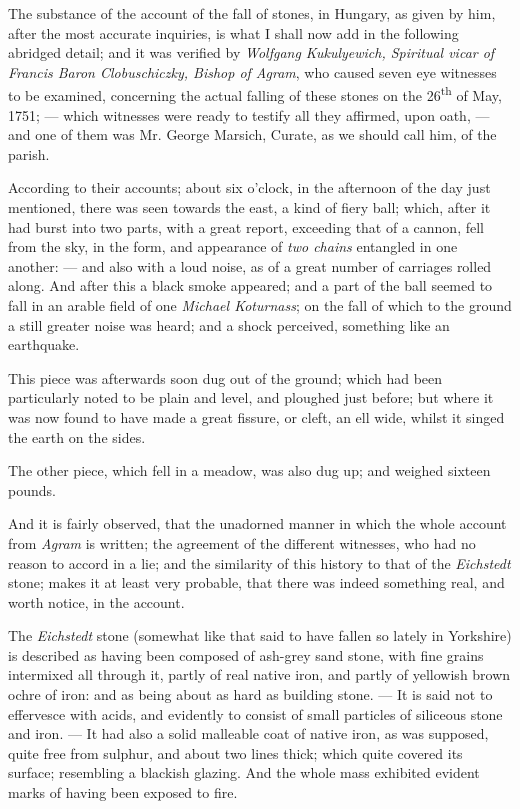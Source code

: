 \documentclass[a4paper, 12pt, oneside, twocolumn]{article}
\begin{document}
The substance of the account of the fall of stones, in Hungary, as given by him, after the most accurate inquiries, is what I shall now add in the following abridged detail; and it was verified by \emph{Wolfgang Kukulyewich, Spiritual vicar of Francis Baron Clobuschiczky, Bishop of Agram}, who caused seven eye witnesses to be examined, concerning the actual falling of these stones on the 26\textsuperscript{th} of May, 1751; --- which witnesses were ready to testify all they affirmed, upon oath, --- and one of them was Mr. George Marsich, Curate, as we should call him, of the parish.

According to their accounts; about six o'clock, in the afternoon of the day just mentioned, there was seen towards the east, a kind of fiery ball; which, after it had burst into two parts, with a great report, exceeding that of a cannon, fell from the sky, in the form, and appearance of \emph{two chains} entangled in one another: --- and also with a loud noise, as of a great number of carriages rolled along. And after this a black smoke appeared; and a part of the ball seemed to fall in an arable field of one \emph{Michael Koturnass}; on the fall of which to the ground a still greater noise was heard; and a shock perceived, something like an earthquake.

This piece was afterwards soon dug out of the ground; which had been particularly noted to be plain and level, and ploughed just before; but where it was now found to have made a great fissure, or cleft, an ell wide, whilst it singed the earth on the sides.

The other piece, which fell in a meadow, was also dug up; and weighed sixteen pounds.

And it is fairly observed, that the unadorned manner in which the whole account from \emph{Agram} is written; the agreement of the different witnesses, who had no reason to accord in a lie; and the similarity of this history to that of the \emph{Eichstedt} stone; makes it at least very probable, that there was indeed something real, and worth notice, in the account.

The \emph{Eichstedt} stone (somewhat like that said to have fallen so lately in Yorkshire) is described as having been composed of ash-grey sand stone, with fine grains intermixed all through it, partly of real native iron, and partly of yellowish brown ochre of iron: and as being about as hard as building stone. --- It is said not to effervesce with acids, and evidently to consist of small particles of siliceous stone and iron. --- It had also a solid malleable coat of native iron, as was supposed, quite free from sulphur, and about two lines thick; which quite covered its surface; resembling a blackish glazing. And the whole mass exhibited evident marks of having been exposed to fire.
\end{document}
